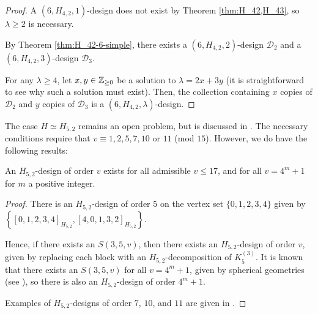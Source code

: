 \begin{proof}
A $(6, H_{4,2}, 1)$-design does not exist by Theorem \ref{thm:H_42,H_43}, so $\lambda \geq 2$ is necessary.

By Theorem \ref{thm:H_42-6-simple}, there exists a $(6, H_{4,2}, 2)$-design $\mathcal{D}_2$ and a $(6, H_{4,2}, 3)$-design $\mathcal{D}_3$.

For any $\lambda \geq 4$, let $x, y \in \mathbb{Z}_{\geq 0}$ be a solution to $\lambda = 2x + 3y$
  (it is straightforward to see why such a solution must exist).
Then, the collection containing $x$ copies of $\mathcal{D}_2$ and $y$ copies of $\mathcal{D}_3$ is a $(6, H_{4,2}, \lambda)$-design.
\end{proof}




The case $H \simeq H_{5,2}$ remains an open problem, but is discussed in \cite{mesz-rosa}.
The necessary conditions require that $v \equiv 1, 2, 5, 7, 10$ or $11$ (mod $15$).
However, we do have the following results:

\begin{theorem} \label{thm:H_52}
An $H_{5,2}$-design of order $v$ exists for all admissible $v \leq 17$, and for
all $v = 4^m + 1$ for $m$ a positive integer.
\end{theorem}

\begin{proof}
There is an $H_{5,2}$-design of order $5$ on the vertex set $\{0,1,2,3,4\}$
  given by $\left\{[0,1,2,3,4]_{H_{5,2}}, [4, 0, 1, 3, 2]_{H_{5,2}} \right\}$.

Hence, if there exists an $S(3, 5, v)$, then there exists an $H_{5,2}$-design of order $v$, given by replacing each block with an $H_{5,2}$-decomposition of $K_5^{(3)}$.
It is known that there exists an $S(3, 5, v)$ for all $v = 4^m+1$, given by spherical geometries (see \cite{khos-laue}), so there is also an $H_{5,2}$-design of order $4^m+1$.

Examples of $H_{5,2}$-designs of order $7$, $10$, and $11$ are given in \cite{mesz-rosa}.
\end{proof}
